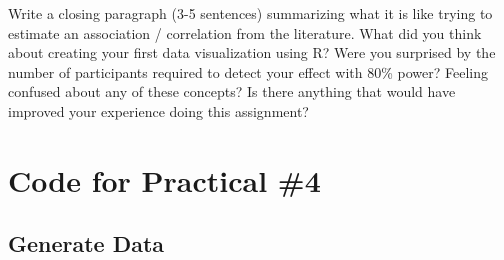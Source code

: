 \documentclass[
]{book}
\newenvironment{Shaded}{\begin{snugshade}}{\end{snugshade}}
\newcommand{\AttributeTok}[1]{\textcolor[rgb]{0.13,0.29,0.53}{#1}}
\newcommand{\CommentTok}[1]{\textcolor[rgb]{0.56,0.35,0.01}{\textit{#1}}}
\newcommand{\ConstantTok}[1]{\textcolor[rgb]{0.56,0.35,0.01}{#1}}
\newcommand{\FunctionTok}[1]{\textcolor[rgb]{0.13,0.29,0.53}{\textbf{#1}}}
\newcommand{\NormalTok}[1]{#1}
\newcommand{\SpecialCharTok}[1]{\textcolor[rgb]{0.81,0.36,0.00}{\textbf{#1}}}
\begin{document}
Write a closing paragraph (3-5 sentences) summarizing what it is like trying to estimate an association / correlation from the literature. What did you think about creating your first data visualization using R? Were you surprised by the number of participants required to detect your effect with 80\% power? Feeling confused about any of these concepts? Is there anything that would have improved your experience doing this assignment?

\section*{Code for Practical \#4}\label{code-for-practical-4}

\begin{Shaded}
\end{Shaded}

\subsection*{Generate Data}\label{generate-data}
\end{document}
